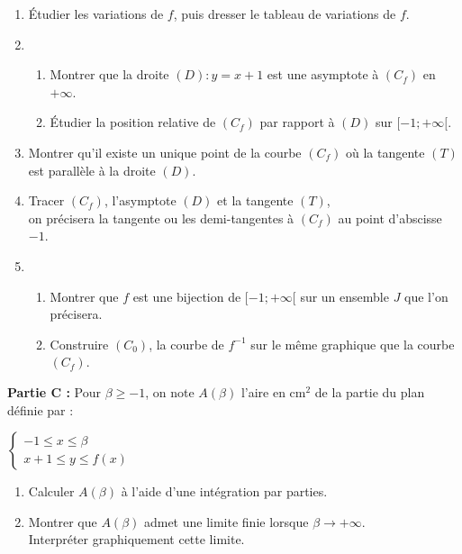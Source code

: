 \documentclass[12pt,a4paper]{article}
\begin{document}
\begin{multicols}{2}
\begin{enumerate}
    \item Étudier les variations de \( f \), puis dresser le tableau de variations de \( f \).

    \item
    \begin{enumerate}
        \item Montrer que la droite \( (D) : y = x + 1 \) est une asymptote à \( (C_f) \) en \( +\infty \).
        \item Étudier la position relative de \( (C_f) \) par rapport à \( (D) \) sur \( [-1 ; +\infty[ \).
    \end{enumerate}

    \item Montrer qu’il existe un unique point de la courbe \( (C_f) \) où la tangente \( (T) \) est parallèle à la droite \( (D) \).

    \item Tracer \( (C_f) \), l’asymptote \( (D) \) et la tangente \( (T) \),\\
    on précisera la tangente ou les demi-tangentes à \( (C_f) \) au point d’abscisse \( -1 \).

    \item
    \begin{enumerate}
        \item Montrer que \( f \) est une bijection de \( [-1 ; +\infty[ \) sur un ensemble \( J \) que l’on précisera.
        \item Construire \( (C_0) \), la courbe de \( f^{-1} \) sur le même graphique que la courbe \( (C_f) \).
    \end{enumerate}
\end{enumerate}

\textbf{Partie C :} Pour \( \beta \geq -1 \), on note \( A(\beta) \) l’aire en \( \text{cm}^2 \) de la partie du plan définie par :

\(
\left\{
\begin{array}{l}
-1 \leq x \leq \beta \\
x + 1 \leq y \leq f(x)
\end{array}
\right.
\)

\begin{enumerate}
    \item Calculer \( A(\beta) \) à l’aide d’une intégration par parties.
    \item Montrer que \( A(\beta) \) admet une limite finie lorsque \( \beta \to +\infty \).\\
    Interpréter graphiquement cette limite.
\end{enumerate}


\end{multicols}
\end{document}
